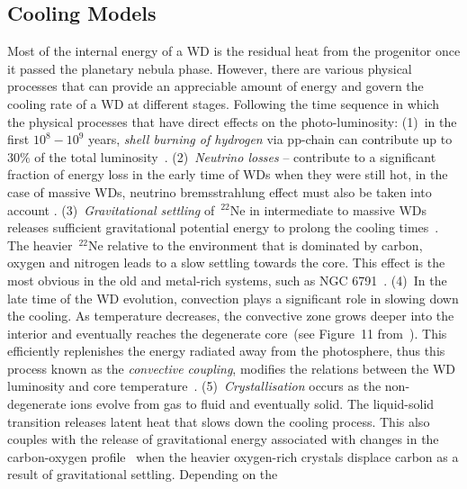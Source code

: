 \documentclass[fleqn,usenatbib]{rasti}
\begin{document}
\subsection{Cooling Models}
\label{sec:cooling_models}
Most of the internal energy of a WD is the residual heat from the progenitor
once it passed the planetary nebula phase. However, there are various physical
processes that can provide an appreciable amount of energy and govern the
cooling rate of a WD at different stages. Following the time sequence in which
the physical processes that have direct effects on the photo-luminosity: (1)~in
the first $10^8-10^9$ years, \textit{shell burning of hydrogen} via pp-chain
can contribute up to $30\%$ of the total luminosity~\citep{2010ApJ...717..183R}.
(2)~\textit{Neutrino losses} -- contribute to a significant fraction of energy
loss in the early time of WDs when they were still hot, in the case of massive
WDs, neutrino bremsstrahlung effect must also be taken into account
\citep{1994ApJ...425..222H, 1996ApJS..102..411I}. (3)~\textit{Gravitational
settling} of\ $^{22}$Ne in intermediate to massive WDs releases sufficient
gravitational potential energy to prolong the cooling
times~\citep{2002ApJ...580.1077D, 2008ApJ...677..473G, 2010ApJ...719..612A}.
The heavier\ $^{22}$Ne relative to the environment that is dominated by carbon,
oxygen and nitrogen leads to a slow settling towards the core. This effect is
the most obvious in the old and metal-rich systems, such as NGC
6791~\citep{2010Natur.465..194G, 2008ApJ...678.1279B}. (4)~In the late time of
the WD evolution, convection plays a significant role in slowing down the
cooling. As temperature decreases, the convective zone grows deeper into the
interior and eventually reaches the degenerate core~(see Figure~11
from~\citealt{2010A&ARv..18..471A}). This efficiently replenishes the energy
radiated away from the photosphere, thus this process known as the
\textit{convective coupling}, modifies the relations between the WD luminosity
and core temperature~\citep{1989ApJ...347..934D, 2001PASP..113..409F}.
(5)~\textit{Crystallisation} occurs as the non-degenerate ions evolve from gas
to fluid and eventually solid. The liquid-solid transition releases latent
heat that slows down the cooling process. This also couples with the release
of gravitational energy associated with changes in the carbon-oxygen
profile~\citep{1997ApJ...486..413S} when the heavier oxygen-rich crystals
displace carbon as a result of gravitational settling. Depending on the
\end{document}
